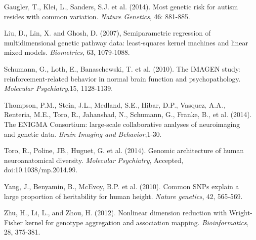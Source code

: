 \documentclass[12pt]{article}
\begin{document}
\vspace{-0.1in}
\begin{list}{[]}{\setlength{\parsep}{0in}\setlength{\itemsep}{\adjitsepb}\setlength{\itemindent}{0in}}\item Gaugler, T., Klei, L., Sanders, S.J. et al. (2014). Most genetic risk for autism resides with common variation. \emph{Nature Genetics}, 46: 881-885.

\item Liu, D., Lin, X. and Ghosh, D. (2007), Semiparametric regression of multidimensional genetic pathway data: least-squares kernel machines and linear mixed models. \emph{Biometrics}, 63, 1079-1088. 

\item Schumann, G., Loth, E., Banaschewski, T. et al. (2010). The IMAGEN study: reinforcement-related behavior in normal brain function and psychopathology. \emph{Molecular Psychiatry},15, 1128-1139.

\item Thompson, P.M., Stein, J.L., Medland, S.E., Hibar, D.P., Vasquez, A.A., Renteria, M.E., Toro, R., Jahanshad, N., Schumann, G., Franke, B., et al. (2014). The ENIGMA Consortium: large-scale collaborative analyses of neuroimaging and genetic data. \emph{Brain Imaging and Behavior},1-30.

\item Toro, R., Poline, JB., Huguet, G. et al. (2014). Genomic architecture of human neuroanatomical diversity. \emph{Molecular Psychiatry}, Accepted, doi:10.1038/mp.2014.99.

\item Yang, J., Benyamin, B., McEvoy, B.P. et al. (2010). Common SNPs explain a large proportion of heritability for human height. \emph{Nature genetics}, 42, 565-569.

\item Zhu, H., Li, L., and Zhou, H. (2012). Nonlinear dimension reduction with Wright-Fisher kernel for genotype aggregation and association mapping. \emph{Bioinformatics}, 28, 375-381.
\end{list}
\end{document}
